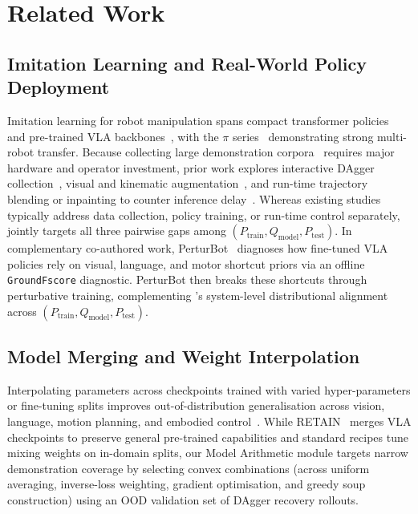 \section{Related Work}\label{kai0:sec:related}

\subsection{Imitation Learning and Real-World Policy Deployment}\label{kai0:sec:related_il}
Imitation learning for robot manipulation spans compact transformer policies~\cite{zhao2023aloha,chi2023diffusion,chi2024umi,zeng2024learning} and pre-trained VLA backbones~\cite{brohan2023rt1,kim2024openvla,zitkovich2023rt2,bu2025univla,team2024octo,black2025pi05,amin2026pistar06}, with the $\pi$ series~\cite{black2024pi0,black2025pi05,amin2026pistar06} demonstrating strong multi-robot transfer. Because collecting large demonstration corpora~\cite{khazatsky2024droid,bu2025agibot_iros,oneill2024openx,walke2023bridgedata,jiang2025galaxea} requires major hardware and operator investment, prior work explores interactive DAgger collection~\cite{ross2011dagger,hu2025rac,kelly2019hgdagger,amin2026pistar06}, visual and kinematic augmentation~\cite{laskin2020reinforcement,yu2023scaling,kostrikov2020image,li2025gr}, and run-time trajectory blending or inpainting to counter inference delay~\cite{zhao2023aloha,black2025rtc,tang2025vlash}. Whereas existing studies typically address data collection, policy training, or run-time control separately, \chiz jointly targets all three pairwise gaps among $(P_{\mathrm{train}}, Q_{\mathrm{model}}, P_{\mathrm{test}})$. In complementary co-authored work, PerturBot~\cite{liu2026perturbot} diagnoses how fine-tuned VLA policies rely on visual, language, and motor shortcut priors via an offline \texttt{GroundFscore} diagnostic. PerturBot then breaks these shortcuts through perturbative training, complementing \chiz's system-level distributional alignment across $(P_{\mathrm{train}}, Q_{\mathrm{model}}, P_{\mathrm{test}})$.

\subsection{Model Merging and Weight Interpolation}\label{kai0:sec:related_merge}
Interpolating parameters across checkpoints trained with varied hyper-parameters or fine-tuning splits improves out-of-distribution generalisation across vision, language, motion planning, and embodied control~\cite{wortsman2022soups,yadav2023ties,ilharco2023task,Yang2024ModelMI,Akiba2024EvolutionaryOO,Lee2025InteractionMergedMP,wang2024fleet}. While RETAIN~\cite{Yadav2025RobustFO} merges VLA checkpoints to preserve general pre-trained capabilities and standard recipes tune mixing weights on in-domain splits, our Model Arithmetic module targets narrow demonstration coverage by selecting convex combinations (across uniform averaging, inverse-loss weighting, gradient optimisation, and greedy soup construction) using an OOD validation set of DAgger recovery rollouts.

